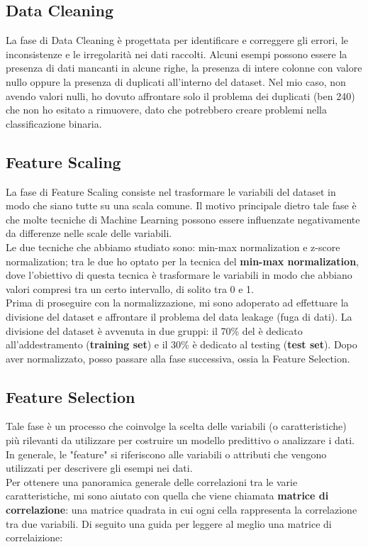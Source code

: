 \documentclass{article}
\begin{document}
\begin{titlepage}
        \subsection{Data Cleaning}
        La fase di Data Cleaning  è progettata per identificare e correggere gli errori, le inconsistenze e le irregolarità nei dati raccolti. Alcuni esempi possono essere la presenza di dati mancanti in alcune righe, la presenza di intere colonne con valore nullo oppure la presenza di duplicati all'interno del dataset. Nel mio caso, non avendo valori nulli, ho dovuto affrontare solo il problema dei duplicati (ben 240) che non ho esitato a rimuovere, dato che potrebbero creare problemi nella classificazione binaria. 

        \newpage
        \subsection{Feature Scaling}
        La fase di Feature Scaling consiste nel trasformare le variabili del dataset in modo che siano tutte su una scala comune. Il motivo principale dietro tale fase è che molte tecniche di Machine Learning possono essere influenzate negativamente da differenze nelle scale delle variabili. \\Le due tecniche che abbiamo studiato sono: min-max normalization e z-score normalization; tra le due ho optato per la tecnica del \textbf{min-max normalization}, dove l'obiettivo di questa tecnica è trasformare le variabili in modo che abbiano valori compresi tra un certo intervallo, di solito tra 0 e 1. \\
         Prima di proseguire con la normalizzazione, mi sono adoperato ad effettuare la divisione del dataset e affrontare il problema del data leakage (fuga di dati). La divisione del dataset è avvenuta in due gruppi: il 70\% del è dedicato all'addestramento (\textbf{training set}) e il 30\% è dedicato al testing (\textbf{test set}).
        Dopo aver normalizzato, posso passare alla fase successiva, ossia la Feature Selection.

        \subsection{Feature Selection}
        Tale fase è un processo che coinvolge la scelta delle variabili (o caratteristiche) più rilevanti da utilizzare per costruire un modello predittivo o analizzare i dati. In generale, le "feature" si riferiscono alle variabili o attributi che vengono utilizzati per descrivere gli esempi nei dati. \\
        Per ottenere una panoramica generale delle correlazioni tra le varie caratteristiche, mi sono aiutato con quella che viene chiamata \textbf{matrice di correlazione}: una matrice quadrata in cui ogni cella rappresenta la correlazione tra due variabili. Di seguito una guida per leggere al meglio una matrice di correlaizione:
        

\end{titlepage}
\end{document}
